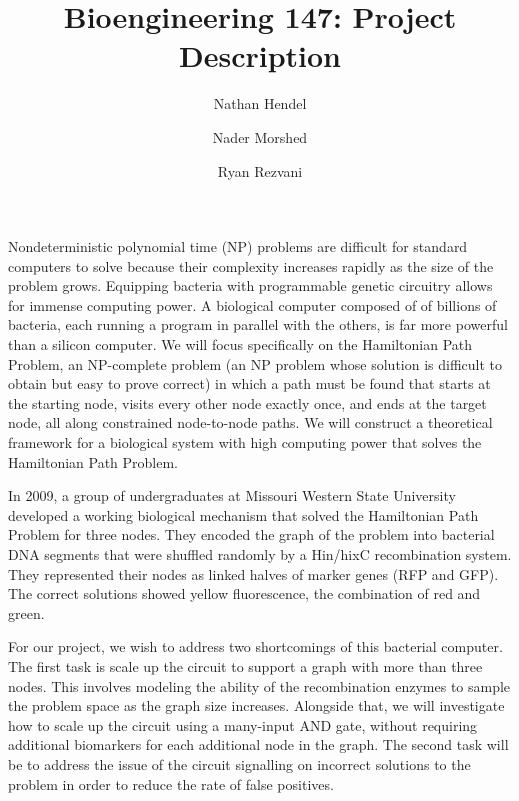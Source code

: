 \documentclass{article}
\title{Bioengineering 147: Project Description}
\author{Nathan Hendel \and Nader Morshed \and Ryan Rezvani}
\begin{document}
\maketitle
\thispagestyle{empty}
\pagestyle{empty}

Nondeterministic polynomial time (NP) problems are difficult for standard computers to solve because their complexity increases rapidly as the size of the problem grows. Equipping bacteria with programmable genetic circuitry allows for immense computing power. A biological computer composed of of billions of bacteria, each running a program in parallel with the others, is far more powerful than a silicon computer. We will focus specifically on the Hamiltonian Path Problem, an NP-complete problem (an NP problem whose solution is difficult to obtain but easy to prove correct) in which a path must be found that starts at the starting node, visits every other node exactly once, and ends at the target node, all along constrained node-to-node paths. We will construct a theoretical framework for a biological system with high computing power that solves the Hamiltonian Path Problem.

In 2009, a group of undergraduates at Missouri Western State University developed a working biological mechanism that solved the Hamiltonian Path Problem for three nodes\cite{Baumgardner2009}. They encoded the graph of the problem into bacterial DNA segments that were shuffled randomly by a Hin/hixC recombination system. They represented their nodes as linked halves of marker genes (RFP and GFP). The correct solutions showed yellow fluorescence, the combination of red and green.

For our project, we wish to address two shortcomings of this bacterial computer. The first task is scale up the circuit to support a graph with more than three nodes. This involves modeling the ability of the recombination enzymes to sample the problem space as the graph size increases. Alongside that, we will investigate how to scale up the circuit using a many-input AND gate, without requiring additional biomarkers for each additional node in the graph. The second task will be to address the issue of the circuit signalling on incorrect solutions to the problem in order to reduce the rate of false positives.
\end{document}
